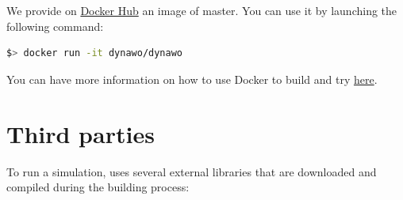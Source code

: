 \documentclass[a4paper, 12pt]{report}
\begin{document}
We provide on \href{https://hub.docker.com/r/dynawo/dynawo}{Docker Hub} an image of \Dynawo master. You can use it by launching the following command:

\begin{lstlisting}[language=bash]
$> docker run -it dynawo/dynawo
\end{lstlisting}

You can have more information on how to use Docker to build and try \Dynawo \href{https://github.com/dynawo/dynawo-docker}{here}.

\section{Third parties}

To run a simulation, \Dynawo uses several external libraries that are downloaded and compiled during the building process:
\end{document}
